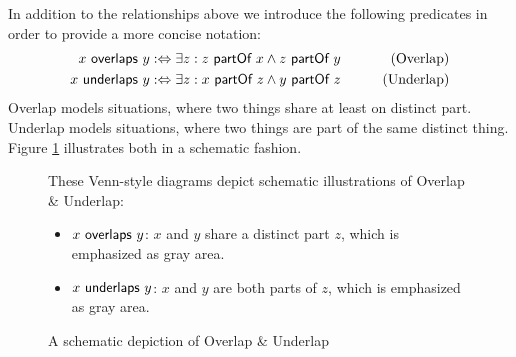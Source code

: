 In addition to the relationships above we introduce the following predicates in order to provide a more concise notation:
\begin{align}
x ~\textsf{overlaps}~ y
&:\Leftrightarrow
\exists z : z ~\textsf{partOf}~ x \wedge z ~\textsf{partOf}~ y
&\qquad \text{(Overlap)}
\label{definition:Overlap}
\\
x ~\textsf{underlaps}~ y
&:\Leftrightarrow
\exists z : x ~\textsf{partOf}~ z \wedge y ~\textsf{partOf}~ z
&\qquad \text{(Underlap)}
\label{definition:Underlap}
\end{align}
Overlap models situations, where two things share at least on distinct part.
Underlap models situations, where two things are part of the same distinct thing.
Figure \ref{figure:SchematicOverlapAndUnderlap} illustrates both in a schematic fashion.

\begin{figure}[h!]
\begin{center}
\hspace*{5mm}
\end{center}
{
\scriptsize 
These Venn-style diagrams depict schematic illustrations of Overlap \& Underlap:
\begin{itemize}
\item
$x ~\textsf{overlaps}~ y$:
$x$ and $y$ share a distinct part $z$, which is emphasized as gray area.
\item
$x ~\textsf{underlaps}~ y$:
$x$ and $y$ are both parts of $z$, which is emphasized as gray area.
\end{itemize}
}
\caption{A schematic depiction of Overlap \& Underlap}
\label{figure:SchematicOverlapAndUnderlap}
\end{figure}

